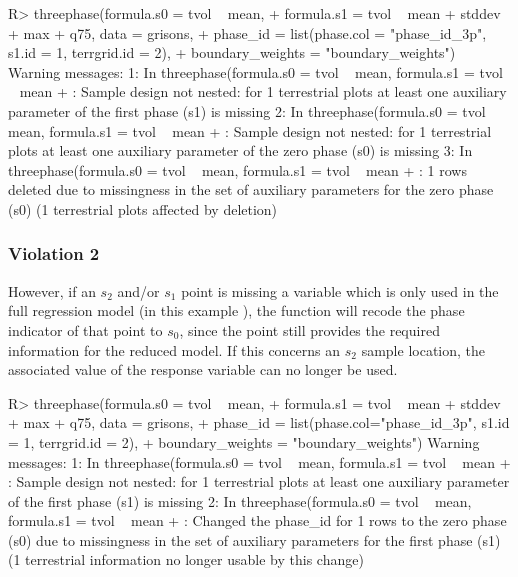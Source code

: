 \documentclass[article]{jss}
\begin{document}
\begin{Schunk}
\begin{Sinput}
R> threephase(formula.s0 = tvol ~ mean, 
+    formula.s1 = tvol ~  mean + stddev + max + q75, data = grisons,
+    phase_id = list(phase.col = "phase_id_3p", s1.id = 1, terrgrid.id = 2),
+    boundary_weights = "boundary_weights")
Warning messages:
1: In threephase(formula.s0 = tvol ~ mean, formula.s1 = tvol ~ mean +  :
  Sample design not nested: for 1 terrestrial plots at least one auxiliary 
  parameter of the first phase (s1) is missing
2: In threephase(formula.s0 = tvol ~ mean, formula.s1 = tvol ~ mean +  :
  Sample design not nested: for 1 terrestrial plots at least one auxiliary 
  parameter of the zero phase (s0) is missing
3: In threephase(formula.s0 = tvol ~ mean, formula.s1 = tvol ~ mean +  :
  1 rows deleted due to missingness in the set of auxiliary parameters for the 
  zero phase (s0) (1 terrestrial plots affected by deletion)
\end{Sinput}
\end{Schunk}


\subsubsection*{Violation 2}

However, if an $s_2$ and/or $s_1$ point is missing a variable which is only used in the full regression model (in this example ), the function will recode the phase indicator of that point to $s_0$, since the point still provides the required information for the reduced model. If this concerns an $s_2$ sample location, the associated value of the response variable can no longer be used.


\begin{Schunk}
\end{Schunk}



\begin{Schunk}
\begin{Sinput}
R> threephase(formula.s0 = tvol ~ mean, 
+    formula.s1 = tvol ~  mean + stddev + max + q75, data = grisons,
+    phase_id = list(phase.col="phase_id_3p", s1.id = 1, terrgrid.id = 2),
+    boundary_weights = "boundary_weights")
Warning messages:
1: In threephase(formula.s0 = tvol ~ mean, formula.s1 = tvol ~ mean +  :
  Sample design not nested: for 1 terrestrial plots at least one auxiliary 
  parameter of the first phase (s1) is missing
2: In threephase(formula.s0 = tvol ~ mean, formula.s1 = tvol ~ mean +  :
  Changed the phase_id for 1 rows to the zero phase (s0) due to missingness in 
  the set of auxiliary parameters for the first phase (s1) (1 terrestrial 
  information no longer usable by this change)
\end{Sinput}
\end{Schunk}
\end{document}
